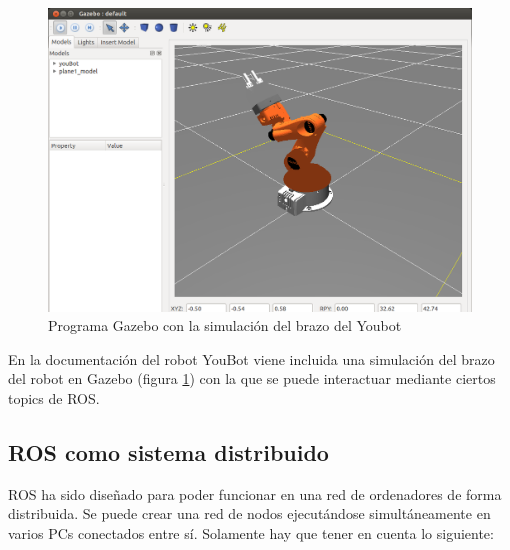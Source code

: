 \documentclass[12pt, a4paper]{report}
\begin{document}
\begin{itemize}
\begin{itemize}
\begin{figure}[h]
	\centering
		\includegraphics[scale=0.3]{../img/gazebo_img.png} 
	\caption[Programa Gazebo con la simulación del brazo del Youbot]{Programa Gazebo con la simulación del brazo del Youbot} 
	\label{fig: gazebo_img}
\end{figure}

En la documentación del robot YouBot viene incluida una simulación del brazo del robot en Gazebo (figura \ref{fig: gazebo_img}) con la que se puede interactuar mediante ciertos topics de ROS.

\end{itemize}

\end{itemize}

\subsection{ROS como sistema distribuido}

ROS ha sido diseñado para poder funcionar en una red de ordenadores de forma distribuida. Se puede crear una red de nodos ejecutándose simultáneamente en varios PCs conectados entre sí. Solamente hay que tener en cuenta lo siguiente:
\end{document}
